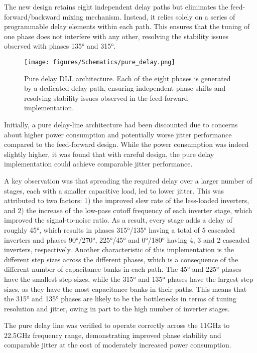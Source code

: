 The new design retains eight independent delay paths but eliminates the feed-forward/backward mixing mechanism. Instead, it relies solely on a series of programmable delay elements within each path. This ensures that the tuning of one phase does not interfere with any other, resolving the stability issues observed with phases \ang{135} and \ang{315}.

\begin{figure}[h]
  \centering
  \texttt{[image: figures/Schematics/pure\_delay.png]}
  \caption{Pure delay DLL architecture. Each of the eight phases is generated by a dedicated delay path, ensuring independent phase shifts and resolving stability issues observed in the feed-forward implementation.}
  \label{fig:pure_delay}
\end{figure}


Initially, a pure delay-line architecture had been discounted due to concerns about higher power consumption and potentially worse jitter performance compared to the feed-forward design. While the power consumption was indeed slightly higher, it was found that with careful design, the pure delay implementation could achieve comparable jitter performance.

A key observation was that spreading the required delay over a larger number of stages, each with a smaller capacitive load, led to lower jitter. This was attributed to two factors: 1) the improved slew rate of the less-loaded inverters, and 2) the increase of the low-pass cutoff frequency of each inverter stage, which improved the signal-to-noise ratio. As a result, every stage adds a delay of roughly \ang{45}, which results in phases \ang{315}/\ang{135} having a total of 5 cascaded inverters and phases \ang{90}/\ang{270}, \ang{225}/\ang{45} and \ang{0}/\ang{180} having 4, 3 and 2 cascaded inverters, respectively.
Another characteristic of this implementation is the different step sizes across the different phases, which is a consequence of the different number of capacitance banks in each path. The \ang{45} and \ang{225} phases have the smallest step sizes, while the \ang{315} and \ang{135} phases have the largest step sizes, as they have the most capacitance banks in their paths. This means that the \ang{315} and \ang{135} phases are likely to be the bottlenecks in terms of tuning resolution and jitter, owing in part to the high number of inverter stages.

The pure delay line was verified to operate correctly across the 11GHz to 22.5GHz frequency range, demonstrating improved phase stability and comparable jitter at the cost of moderately increased power consumption.

